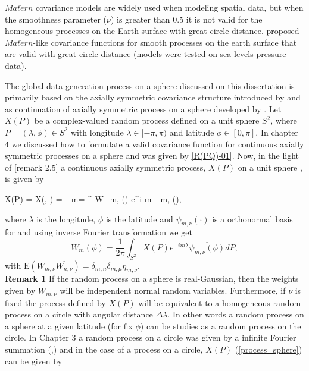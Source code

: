 $Mat\acute{e}rn$ covariance models are widely used when modeling spatial data, but when the smoothness parameter ($\nu$) is greater than 0.5 it is not valid for the homogeneous processes on the Earth surface with great circle distance. \cite{JeongJun2015} proposed $Mat\acute{e}rn$-like covariance functions for smooth processes on the earth surface that are valid with great circle distance (models were tested on sea levels pressure data).


The global data generation process on a sphere discussed on this dissertation is primarily based on the axially symmetric covariance structure introduced by \cite{Jones1963} and as continuation of axially symmetric process on a sphere developed by \cite{Huang2012}.  Let $X(P)$ be a complex-valued random process defined on a unit sphere $S^2$, where $P = (\lambda, \phi) \in S^2$ with longitude $\lambda \in [-\pi, \pi)$ and latitude $\phi \in [0, \pi]$. In chapter 4 we discussed how to formulate a valid covariance function for continuous axially symmetric processes on a sphere and was given by \ref{R(PQ)-01}. Now, in the light of \cite{Huang2012}[remark 2.5] a continuous axially symmetric process, $X(P)$ on a unit sphere , is given by
			
	\beq \label{process_sphere}
	X(P) = X(\phi, \lambda) = \sum_{m=-\infty}^{\infty} W_{m, \nu}(\phi) e^{i m \lambda}\psi_{m,\nu} (\phi),
	\eeq
			
	where $\lambda$ is the longitude, $\phi$ is the latitude and $\psi_{m,\nu}(\cdot)$ is a orthonormal basis for \Cm and using inverse Fourier transformation we get
	\[
		W_m(\phi) = \frac{1}{2\pi} \int_{S^2} X(P) e^{-im\lambda} \overline{\psi_{m,\nu} (\phi)} dP,
	\]
	with $\mbox{E}(W_{m, \nu} \overline{W_{n,\nu}}) = \delta_{m,n}\delta_{m,\mu}\eta_{m,\nu}$. \\
			
	{\bf Remark 1} If the random process on a sphere is real-Gaussian, then the weights given by $W_{m,\nu}$ will be independent normal random variables. Furthermore, if $\nu$ is fixed the process defined by $X(P)$ will be equivalent to a homogeneous random process on a circle with angular distance $\Delta \lambda$. In other words a random process on a sphere at a given latitude (for fix $\phi$) can be studies as a random process on the circle. In Chapter 3 \label{process_circle} a random process on a circle was given by a infinite Fourier summation (\cite{Roy1972},\cite{DUFOUR1976107}) and in the case of a process on a circle, $X(P)$ (\ref{process_sphere}) can be given by   
			
